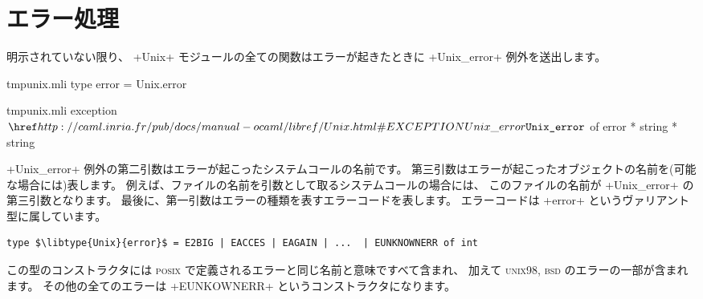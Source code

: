\section{エラー処理}

明示されていない限り、 \ml+Unix+ モジュールの全ての関数はエラーが起きたときに \ml+Unix_error+ 例外を送出します。
%
\begin{codefile}{tmpunix.mli}
type error = Unix.error
\end{codefile}
%
\begin{listingcodefile}{tmpunix.mli}
exception $\libexn{Unix}{Unix\_error}$ of error * string * string
\end{listingcodefile}
%
\ml+Unix_error+ 例外の第二引数はエラーが起こったシステムコールの名前です。
第三引数はエラーが起こったオブジェクトの名前を(可能な場合には)表します。
例えば、ファイルの名前を引数として取るシステムコールの場合には、
このファイルの名前が \ml+Unix_error+ の第三引数となります。
最後に、第一引数はエラーの種類を表すエラーコードを表します。
エラーコードは \ml+error+ というヴァリアント型に属しています。
%
\begin{lstlisting}
type $\libtype{Unix}{error}$ = E2BIG | EACCES | EAGAIN | ...  | EUNKNOWNERR of int
\end{lstlisting}
%
この型のコンストラクタには \textsc{posix} で定義されるエラーと同じ名前と意味ですべて含まれ、
加えて \textsc{unix98}, \textsc{bsd} のエラーの一部が含まれます。
その他の全てのエラーは \ml+EUNKOWNERR+ というコンストラクタになります。

